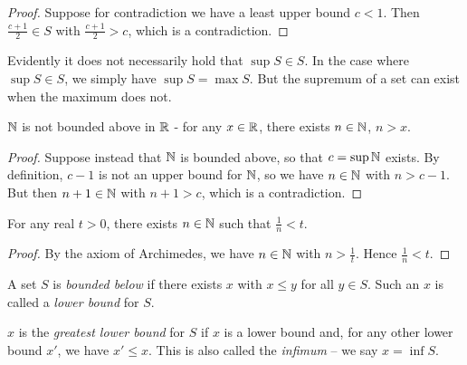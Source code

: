 \documentclass{../../template/note}
\begin{document}
    \begin{proof}
        Suppose for contradiction we have a least upper bound \(c < 1\). Then \(\frac{c+1}{2} \in S\) with \(\frac{c+1}{2} > c\), which is a contradiction.
    \end{proof}
    
    \begin{remark*}
        Evidently it does not necessarily hold that \(\sup S \in S\). In the case where \(\sup S \in S\), we simply have \(\sup S = \max S\). But the supremum of a set can exist when the maximum does not.
    \end{remark*}
    
    \begin{proposition}
        \(\mathbb N\) is not bounded above in \(\mathbb R\) - for any \(x \in \mathbb R\), there exists \(n \in \mathbb N\), \(n > x\).
        \label{archimedes}
    \end{proposition}
    
    \begin{proof}
        Suppose instead that \(\mathbb N\) is bounded above, so that \(c = \sup \mathbb N\) exists. By definition, \(c-1\) is not an upper bound for \(\mathbb N\), so we have \(n \in \mathbb N\) with \(n > c-1\). But then \(n+1 \in \mathbb N\) with \(n+1 > c\), which is a contradiction.
    \end{proof}
    
    \begin{corollary}
        For any real \(t > 0\), there exists \(n \in \mathbb N\) such that \(\frac{1}{n} < t\).
        \label{archimedes-modified}
    \end{corollary}
    
    \begin{proof}
        By the axiom of Archimedes, we have \(n \in \mathbb N\) with \(n > \frac{1}{t}\). Hence \(\frac{1}{n} < t\).
    \end{proof}
    
    \begin{definition}
        A set \(S\) is \emph{bounded below} if there exists \(x\) with \(x \leq y\) for all \(y \in S\). Such an \(x\) is called a \emph{lower bound} for \(S\).
    \end{definition}
    
    \begin{definition}
        \(x\) is the \emph{greatest lower bound} for \(S\) if \(x\) is a lower bound and, for any other lower bound \(x'\), we have \(x' \leq x\). This is also called the \emph{infimum} -- we say \(x = \inf S\).
    \end{definition}
    
\end{document}
